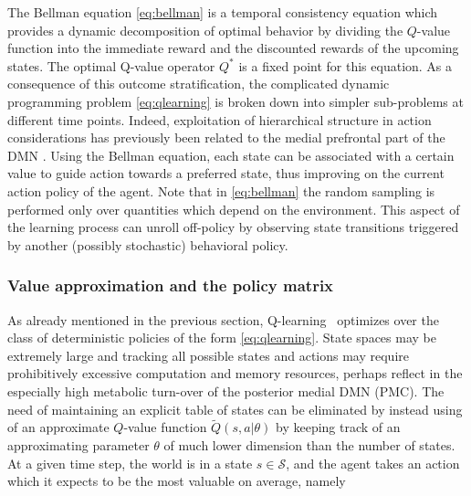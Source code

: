 \documentclass[10pt,letterpaper]{article}
\begin{document}
The Bellman equation \eqref{eq:bellman} is a temporal consistency equation which provides
a dynamic decomposition of optimal behavior by dividing the $Q$-value function into the immediate
reward and the discounted rewards of the upcoming states.
The optimal Q-value operator $Q^*$ is a fixed point for this equation.
As a consequence of this outcome stratification, the complicated dynamic programming
problem \eqref{eq:qlearning}
is broken down into simpler sub-problems at different time points.
Indeed,
exploitation of hierarchical structure in action considerations
has previously been related to the medial prefrontal part of the DMN
\citep{koechlin1999role, braver2002role}.
Using the Bellman equation, each state can be associated with a certain value
to guide action towards a preferred state, thus improving on the
current action policy of the agent.
Note that in \eqref{eq:bellman} the random sampling
is performed only over quantities which
depend on the environment.
This aspect of the learning process
can unroll off-policy by observing state transitions
triggered by another (possibly stochastic) behavioral policy.

\subsubsection{Value approximation and the policy matrix}
\label{sec:policymat}
As already mentioned in the previous section, Q-learning~\citep{watkins92} optimizes over the class of
deterministic policies of the form \eqref{eq:qlearning}. State spaces may be extremely large
and tracking all possible states and actions may require prohibitively excessive
computation and memory resources, perhaps reflect in the especially high metabolic
turn-over of the posterior medial DMN (PMC).
The need of maintaining an explicit table of
states can be eliminated by instead using of an approximate $Q$-value function $\tilde{Q}(s,a|\theta)$
by keeping track of an approximating parameter $\theta$ of much lower dimension than the number of states.
At a given time step, the world is in a state $s \in \mathcal S$, and the agent takes an
action which it expects to be the most valuable on average, namely
\end{document}
